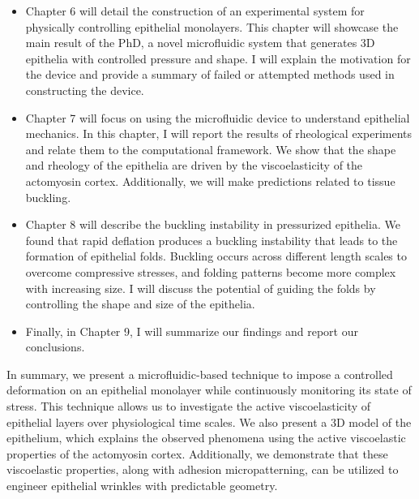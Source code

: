 \begin{itemize}
\item Chapter 6 will detail the construction of an experimental system for physically controlling epithelial monolayers. This chapter will showcase the main result of the PhD, a novel microfluidic system that generates 3D epithelia with controlled pressure and shape. I will explain the motivation for the device and provide a summary of failed or attempted methods used in constructing the device.
\item Chapter 7 will focus on using the microfluidic device to understand epithelial mechanics. In this chapter, I will report the results of rheological experiments and relate them to the computational framework. We show that the shape and rheology of the epithelia are driven by the viscoelasticity of the actomyosin cortex. Additionally, we will make predictions related to tissue buckling.
\item Chapter 8 will describe the buckling instability in pressurized epithelia. We found that rapid deflation produces a buckling instability that leads to the formation of epithelial folds. Buckling occurs across different length scales to overcome compressive stresses, and folding patterns become more complex with increasing size. I will discuss the potential of guiding the folds by controlling the shape and size of the epithelia.
\item Finally, in Chapter 9, I will summarize our findings and report our conclusions.
\end{itemize}

In summary, we present a microfluidic-based technique to impose a controlled deformation on an epithelial monolayer while continuously monitoring its state of stress. This technique allows us to investigate the active viscoelasticity of epithelial layers over physiological time scales. We also present a 3D model of the epithelium, which explains the observed phenomena using the active viscoelastic properties of the actomyosin cortex. Additionally, we demonstrate that these viscoelastic properties, along with adhesion micropatterning, can be utilized to engineer epithelial wrinkles with predictable geometry.
